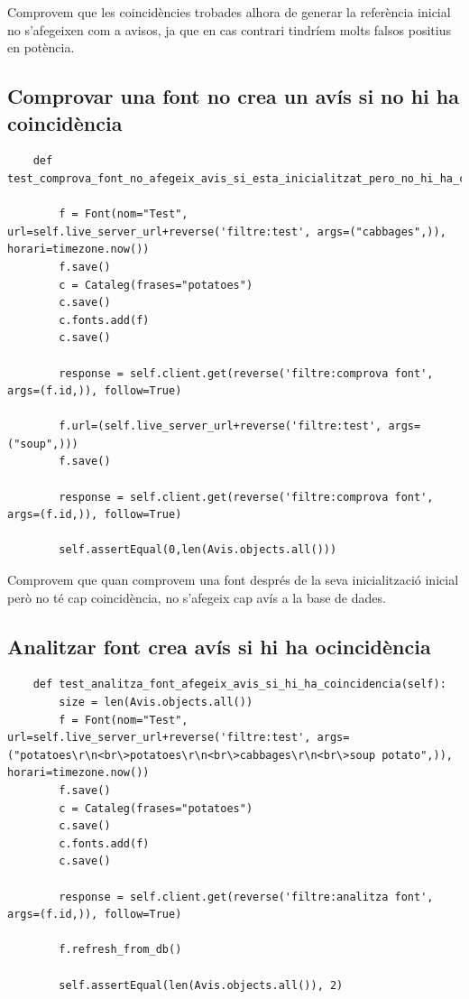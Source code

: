 \documentclass{article}
\begin{document}
Comprovem que les coincidències trobades alhora de generar la referència inicial no s'afegeixen com a avisos, ja que en cas contrari tindríem molts falsos positius en potència.


\subsection{Comprovar una font no crea un avís si no hi ha coincidència}

\begin{lstlisting}
    def test_comprova_font_no_afegeix_avis_si_esta_inicialitzat_pero_no_hi_ha_coincidencia(self):

        f = Font(nom="Test", url=self.live_server_url+reverse('filtre:test', args=("cabbages",)), horari=timezone.now())
        f.save()
        c = Cataleg(frases="potatoes")
        c.save()
        c.fonts.add(f)
        c.save()

        response = self.client.get(reverse('filtre:comprova font', args=(f.id,)), follow=True)

        f.url=(self.live_server_url+reverse('filtre:test', args=("soup",)))
        f.save()

        response = self.client.get(reverse('filtre:comprova font', args=(f.id,)), follow=True)

        self.assertEqual(0,len(Avis.objects.all()))
\end{lstlisting}

Comprovem que quan comprovem una font després de la seva inicialització inicial però no té cap coincidència, no s'afegeix cap avís a la base de dades.

\subsection{Analitzar font crea avís si hi ha ocincidència}

\begin{lstlisting}
    def test_analitza_font_afegeix_avis_si_hi_ha_coincidencia(self):
        size = len(Avis.objects.all())
        f = Font(nom="Test", url=self.live_server_url+reverse('filtre:test', args=("potatoes\r\n<br\>potatoes\r\n<br\>cabbages\r\n<br\>soup potato",)), horari=timezone.now())
        f.save()
        c = Cataleg(frases="potatoes")
        c.save()
        c.fonts.add(f)
        c.save()

        response = self.client.get(reverse('filtre:analitza font', args=(f.id,)), follow=True)

        f.refresh_from_db()

        self.assertEqual(len(Avis.objects.all()), 2)
\end{lstlisting}
\end{document}
